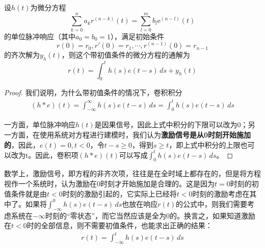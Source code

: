\begin{theorem}
    设$h(t)$为微分方程
    \[\sum_{k=0}^{n}a_{k} r^{(n-k)}(t)=\sum_{l=0}^{m}b_{l} \mathrm{e}^{(n-l)}(t)\]
    的单位脉冲响应（其中$a_0=b_0=1$），满足初始条件
    $$r(0)=r_0,r'(0)=r_1,\cdots,r^{(n-1)}(0)=r_{n-1}$$
    的齐次解为$y_h(t)$，则这个带初值条件的微分方程的通解为
    \[r(t)=\int_{0}^{t}h(s)e(t-s)\,ds + y_h(t)\]
\end{theorem}
\begin{proof}
    我们说明，为什么带初值条件的情况下，卷积积分\begin{align*}
        (h*e)(t)=\int_{-\infty}^{\infty} h(s)e(t-s)\,ds=\int_{0}^{t} h(s)e(t-s)\,ds
    \end{align*}

    一方面，单位脉冲响应$h(t)$是因果信号，因此上式中积分的下限可以改为0；另一方面，在使用系统对方程进行建模时，我们认为\textbf{激励信号是从0时刻开始施加的}，因此，$e(t)=0,t<0$，令$t-s\geq 0$，得到$s\geq t$，即上式中积分的上限也可以改为t。因此，卷积项$(h*e)(t)$可以写成$\int_{0}^{t} h(s)e(t-s)\,ds$。
\end{proof}

数学上，激励信号，即方程的非齐次项，往往是在全时域上都存在的，但是将方程视作一个系统时，认为激励在0时刻才开始施加是合理的。这是因为$t=0$时刻的初值条件就是由$t<0$时刻的激励引起的，它实际上已经将$t<0$时刻的激励考虑在其中了。如果将$\int_{-\infty}^0 h(s)e(t-s)\,ds$也放在响应$r(t)$的公式中，则我们需要考虑系统在$-\infty$时刻的“零状态”，而它当然应该是全为0的。换言之，如果知道激励在$t<0$时的全部信息，则不需要初值条件，也能求出正确的结果：\begin{align*}
    r(t)=\int_{-\infty}^{t} h(s)e(t-s)\,ds
\end{align*}
